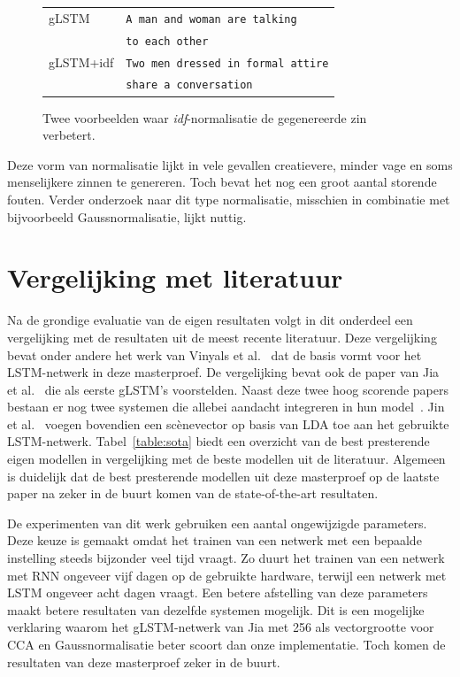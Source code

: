\begin{figure}
\begin{minipage}[t]{.3\textwidth}
	\end{minipage}\hfill
	\begin{minipage}[t]{.7\textwidth}
		\vspace{0pt}
		\begin{tabular}{ll}
			gLSTM & \texttt{A man and woman are talking} \\ 
			~ & \texttt{to each other} \\
			gLSTM+idf & \texttt{Two men dressed in formal attire}\\
			~ & \texttt{share a conversation} \\
		\end{tabular}
	\end{minipage}
	\caption{Twee voorbeelden waar \emph{idf}-normalisatie de gegenereerde zin verbetert.}
	\label{fig:betteridf}
\end{figure}

Deze vorm van normalisatie lijkt in vele gevallen creatievere, minder vage en soms menselijkere zinnen te genereren. Toch bevat het nog een groot aantal storende fouten. Verder onderzoek naar dit type normalisatie, misschien in combinatie met bijvoorbeeld Gaussnormalisatie, lijkt nuttig. 

\section{Vergelijking met literatuur} %
\label{sec:vergelijking_met_literatuur}
Na de grondige evaluatie van de eigen resultaten volgt in dit onderdeel een vergelijking met de resultaten uit de meest recente literatuur.
Deze vergelijking bevat onder andere het werk van Vinyals et al.~\cite{Google} dat de basis vormt voor het LSTM-netwerk in deze masterproef. 
De vergelijking bevat ook de paper van Jia et al.~\cite{Fernando2015} die als eerste gLSTM's voorstelden.
Naast deze twee hoog scorende papers bestaan er nog twee systemen die allebei aandacht integreren in hun model~\cite{Jin2015,Xu2015}.
Jin et al.~\cite{Jin2015} voegen bovendien een sc\`enevector op basis van LDA toe aan het gebruikte LSTM-netwerk.
Tabel~\ref{table:sota} biedt een overzicht van de best presterende eigen modellen in vergelijking met de beste modellen uit de literatuur.
Algemeen is duidelijk dat de best presterende modellen uit deze masterproef op de laatste paper na zeker in de buurt komen van de state-of-the-art resultaten.

De experimenten van dit werk gebruiken een aantal ongewijzigde parameters.
Deze keuze is gemaakt omdat het trainen van een netwerk met een bepaalde instelling steeds bijzonder veel tijd vraagt.
Zo duurt het trainen van een netwerk met RNN ongeveer vijf dagen op de gebruikte hardware, terwijl een netwerk met LSTM ongeveer acht dagen vraagt.
Een betere afstelling van deze parameters maakt betere resultaten van dezelfde systemen mogelijk.
Dit is een mogelijke verklaring waarom het gLSTM-netwerk van Jia met 256 als vectorgrootte voor CCA en Gaussnormalisatie beter scoort dan onze implementatie.
Toch komen de resultaten van deze masterproef zeker in de buurt.

